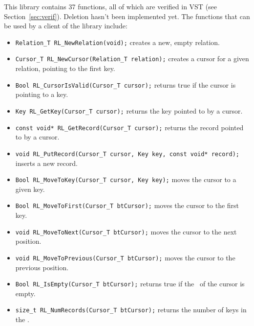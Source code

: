 This library contains 37 functions, all of which are verified in VST (see Section~\ref{sec:verif}).
Deletion hasn't been implemented yet.
The functions that can be used by a client of the library include:
\begin{itemize}
\item \lstinline{Relation_T RL_NewRelation(void);}  creates a new, empty relation.
\item \lstinline{Cursor_T RL_NewCursor(Relation_T relation);}  creates a cursor for a given relation, pointing to the first key.
\item \lstinline{Bool RL_CursorIsValid(Cursor_T cursor);}  returns true if the cursor is pointing to a key.
\item \lstinline{Key RL_GetKey(Cursor_T cursor);}  returns the key pointed to by a cursor.
\item \lstinline{const void* RL_GetRecord(Cursor_T cursor);}  returns the record pointed to by a cursor.
\item \lstinline{void RL_PutRecord(Cursor_T cursor, Key key, const void* record);}  inserts a new record.
\item \lstinline{Bool RL_MoveToKey(Cursor_T cursor, Key key);}  moves the cursor to a given key.
\item \lstinline{Bool RL_MoveToFirst(Cursor_T btCursor);}  moves the cursor to the first key.
\item \lstinline{void RL_MoveToNext(Cursor_T btCursor);}  moves the cursor to the next position.
\item \lstinline{void RL_MoveToPrevious(Cursor_T btCursor);}  moves the cursor to the previous position.
\item \lstinline{Bool RL_IsEmpty(Cursor_T btCursor);}  returns true if the \btree\ of the cursor is empty.
\item \lstinline{size_t RL_NumRecords(Cursor_T btCursor);}  returns the number of keys in the \btree.
\end{itemize}


